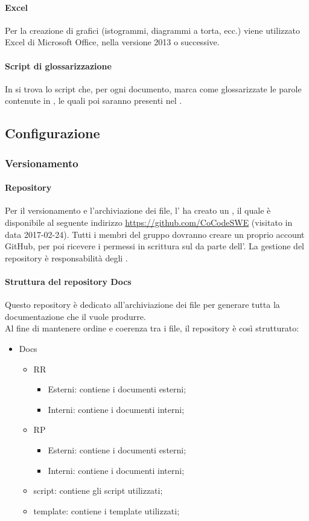  \paragraph{Excel}
Per la creazione di grafici (istogrammi, diagrammi a torta, ecc.) viene utilizzato Excel di Microsoft Office, nella versione 2013 o successive.
\paragraph{Script di glossarizzazione}

In \GloScript{} si trova lo script che, per ogni documento, marca come glossarizzate le parole contenute in , le quali poi saranno presenti nel \Gldoc.
\subsection{Configurazione}
\subsubsection{Versionamento}
\paragraph{Repository}
Per il versionamento e l'archiviazione dei file, l'\AMM{} ha creato un  , il quale è disponibile al seguente indirizzo \url{https://github.com/CoCodeSWE} (visitato in data 2017-02-24). Tutti i membri del gruppo dovranno creare un proprio account GitHub, per poi ricevere i permessi in scrittura sul  da parte dell'\AMM.
La gestione del repository è responsabilità degli \AMMP.
\paragraph{Struttura del repository Docs}
Questo repository è dedicato all'archiviazione dei file per generare tutta la documentazione che il  vuole produrre.\\
Al fine di mantenere ordine e coerenza tra i file, il repository è così strutturato:
\begin{itemize}
	\item Docs
	\begin{itemize}
		\item RR
		\begin{itemize}
			\item Esterni: contiene i documenti esterni;
			\item Interni: contiene i documenti interni;
		\end{itemize}
		\item RP
		\begin{itemize}
			\item Esterni: contiene i documenti esterni;
			\item Interni: contiene i documenti interni;
		\end{itemize}
		\item script: contiene gli script utilizzati;
		\item template: contiene i template utilizzati;
	\end{itemize}
\end{itemize}
